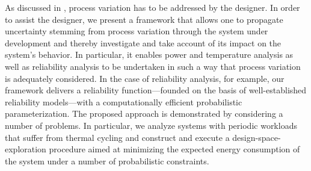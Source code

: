 As discussed in , process variation has to be addressed
by the designer. In order to assist the designer, we present a framework that
allows one to propagate uncertainty stemming from process variation through the
system under development and thereby investigate and take account of its impact
on the system's behavior. In particular, it enables power and temperature
analysis as well as reliability analysis to be undertaken in such a way that
process variation is adequately considered. In the case of reliability analysis,
for example, our framework delivers a reliability function---founded on the
basis of well-established reliability models---with a computationally efficient
probabilistic parameterization. The proposed approach is demonstrated by
considering a number of problems. In particular, we analyze systems with
periodic workloads that suffer from thermal cycling and construct and execute a
design-space-exploration procedure aimed at minimizing the expected energy
consumption of the system under a number of probabilistic constraints.
